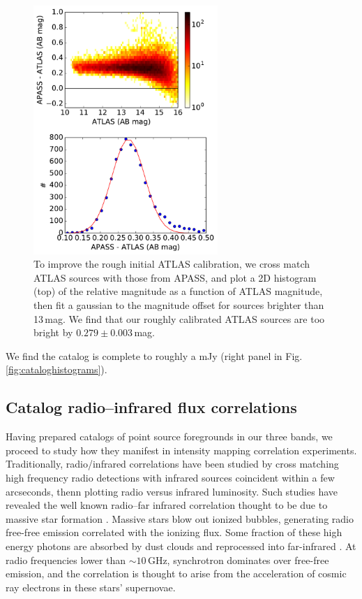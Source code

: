 \documentclass{emulateapj}
\begin{document}
\begin{figure}[t]
\centering
\includegraphics[width=2.75in]{images/ATLAS_vs_APASS_cal.pdf}
\caption{To improve the rough initial ATLAS calibration, we cross match ATLAS sources with those from APASS, and plot a 2D histogram (top) of the relative magnitude as a function of ATLAS magnitude, then fit a gaussian to the magnitude offset for sources brighter than 13\,mag. We find that our roughly calibrated ATLAS sources are too bright by $0.279\pm0.003$\,mag.}
\label{fig:ATLASvsAPASS}
\end{figure}

We find the catalog is complete to roughly a mJy (right panel in Fig. \ref{fig:cataloghistograms}). 



\subsection{Catalog radio--infrared flux correlations}
\label{sec:catcorrelations}

Having prepared catalogs of point source foregrounds in our three bands, we proceed to study how they manifest in intensity mapping correlation experiments. Traditionally, radio/infrared correlations have been studied by cross matching high frequency radio detections with infrared sources coincident within a few arcseconds, thenn plotting radio versus infrared luminosity. Such studies have revealed the well known radio--far infrared correlation thought to be due to massive star formation \citep[e.g.][]{helou85,dejong85,yun01,xu94}. Massive stars blow out ionized bubbles, generating radio free-free emission correlated with the ionizing flux. Some fraction of these high energy photons are absorbed by dust clouds and reprocessed into far-infrared \citep{xu94}. At radio frequencies lower than $\sim10$\,GHz, synchrotron dominates over free-free emission, and the correlation is thought to arise from the acceleration of cosmic ray electrons in these stars' supernovae. 
\end{document}
